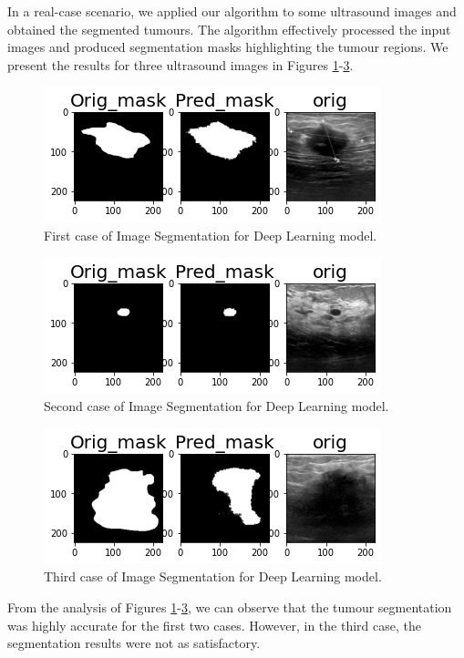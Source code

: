 In a real-case scenario, we applied our algorithm to some ultrasound images and obtained the segmented tumours. The algorithm effectively processed the input images and produced segmentation masks highlighting the tumour regions. We present the results for three ultrasound images in Figures \ref{Figure - DL_Segmentation First case of Image Segmentation}-\ref{Figure - DL_Segmentation Third case of Image Segmentation}.
	\begin{figure}
  		\includegraphics[width=\linewidth]{Figures/segment_dl_1.png}  		  							
  		\caption{First case of Image Segmentation for Deep Learning model.}
		\label{Figure - DL_Segmentation First case of Image Segmentation}
  	\end{figure}
  	\begin{figure}
  		\includegraphics[width=\linewidth]{Figures/segment_dl_2.png}  		  							
  		\caption{Second case of Image Segmentation for Deep Learning model.}
		\label{Figure - DL_Segmentation Second case of Image Segmentation}
  	\end{figure}
  	\begin{figure}
  		\includegraphics[width=\linewidth]{Figures/segment_dl_3.png}  		  							
  		\caption{Third case of Image Segmentation for Deep Learning model.}
		\label{Figure - DL_Segmentation Third case of Image Segmentation}
  	\end{figure}
From the analysis of Figures \ref{Figure - DL_Segmentation First case of Image Segmentation}-\ref{Figure - DL_Segmentation Third case of Image Segmentation}, we can observe that the tumour segmentation was highly accurate for the first two cases. However, in the third case, the segmentation results were not as satisfactory.

